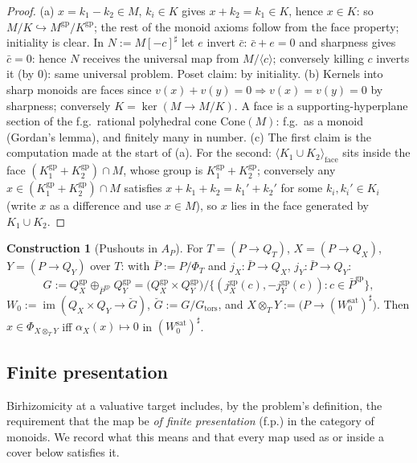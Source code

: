 \documentclass[11pt]{article}
\theoremstyle{definition}
\newtheorem{construction}[theorem]{Construction}
\newcommand{\gp}{\mathrm{gp}}
\newcommand{\sat}{\mathrm{sat}}
\newcommand{\Cone}{\mathrm{Cone}}
\begin{document}
\begin{proof}
(a) $x=k_1-k_2\in M$, $k_i\in K$ gives $x+k_2=k_1\in K$, hence
$x\in K$: so $M/K\hookrightarrow M^{\gp}/K^{\gp}$; 
the rest of the
monoid axioms follow from the face property; initiality is clear.
In $N:=M[-c]^{\sharp}$ let $e$ invert $\bar c$: $\bar c+e=0$ and
sharpness gives $\bar c=0$: hence $N$ receives the universal map from
$M/\langle c\rangle$; conversely killing $c$ inverts it (by $0$): same
universal problem. Poset claim: by initiality.
(b) Kernels into sharp monoids are faces since $v(x)+v(y)=0\Rightarrow
v(x)=v(y)=0$ by sharpness; conversely $K=\ker(M\to M/K)$. A face is a
supporting-hyperplane section of the f.g.\ rational polyhedral cone
$\Cone(M)$: f.g.\ as a monoid (Gordan's lemma), 
and finitely many in
number.
(c) The first claim is the computation made at the start of (a).
For the second: $\langle K_1\cup K_2\rangle_{\mathrm{face}}$ sits
inside the face $(K_1^{\gp}+K_2^{\gp})\cap M$, 
whose group is
$K_1^{\gp}+K_2^{\gp}$; conversely any $x\in(K_1^{\gp}+K_2^{\gp})\cap
M$ satisfies $x+k_1+k_2=k_1'+k_2'$ for some $k_i,k_i'\in K_i$ (write
$x$ as a difference and use $x\in M$), so $x$ lies in the face
generated by $K_1\cup K_2$.
\end{proof}

\begin{construction}[Pushouts in $A_P$]\label{constr:pushout}
For $T=(P\to Q_T)$, $X=(P\to Q_X)$, $Y=(P\to Q_Y)$ over $T$: with
$\bar P:=P/\Phi_T$ and $j_X:\bar P\to Q_X$, $j_Y:\bar P\to Q_Y$:
\[
G:=Q_X^{\gp}\oplus_{\bar P^{\gp}}Q_Y^{\gp}
=\bigl(Q_X^{\gp}\times Q_Y^{\gp}\bigr)\big/
\bigl\{(j_X^{\gp}(c),-j_Y^{\gp}(c)) : c\in\bar P^{\gp}\bigr\},
\]
$W_0:=\operatorname{im}(Q_X\times Q_Y\to\breve G)$,
$\breve G:=G/G_{\mathrm{tors}}$, and
$X\otimes_TY:=\bigl(P\to (W_0^{\sat})^{\sharp}\bigr)$. Then
$x\in\Phi_{X\otimes_TY}$ iff $\alpha_X(x)\mapsto0$ in
$(W_0^{\sat})^{\sharp}$.
\end{construction}

\subsection{Finite presentation}\label{ssec:fp}

Birhizomicity at a valuative target includes, by the problem's
definition, the requirement that the map be \emph{of finite
presentation} (f.p.) in the category of monoids. We record what
this means and that every map used as or inside a cover below
satisfies it.
\end{document}
